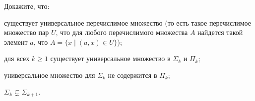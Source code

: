 Докажите, что:
\begin{enumcyr}
    \item существует универсальное перечислимое множество (то есть такое перечислимое множество пар $U$,
        что для любого перечислимого множества $A$ найдется такой элемент $a$, что $A = \{x \mid (a, x)
        \in U\}$);
    \item для всех $k \ge 1$ существует универсальное множество в $\Sigma_k$ и $\Pi_k$;
    \item универсальное множество для $\Sigma_k$ не содержится в $\Pi_k$;
    \item $\Sigma_k \subsetneq \Sigma_{k + 1}$.
\end{enumcyr}